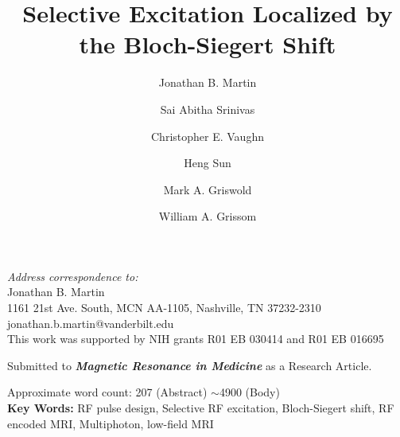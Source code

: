 \documentclass{article}
\begin{document}
\title{\vspace{-2cm}Selective Excitation Localized by the Bloch-Siegert Shift}
\date{}

\author[1,2]{Jonathan B. Martin}
\author[1,2]{Sai Abitha Srinivas}
\author[1,2]{Christopher E. Vaughn}
\author[2]{Heng Sun}
\author[3,4]{Mark A. Griswold}
\author[1,2,5]{William A. Grissom}


\maketitle

\vfill
\noindent

\noindent
\textit{Address correspondence to:} \\
  Jonathan B. Martin \\
  1161 21st Ave. South, MCN AA-1105, Nashville, TN 37232-2310 \\
  jonathan.b.martin@vanderbilt.edu\\


\noindent
This work was supported by NIH grants R01 EB 030414 and R01 EB 016695

\noindent
Submitted to \textbf{\textit{Magnetic Resonance in Medicine}} as a Research Article.

\noindent
Approximate word count: 207 (Abstract) $\sim$4900 (Body)\\

\noindent
\textbf{Key Words:} RF pulse design, Selective RF excitation, Bloch-Siegert shift, RF encoded MRI, Multiphoton, low-field MRI

\clearpage
\end{document}
